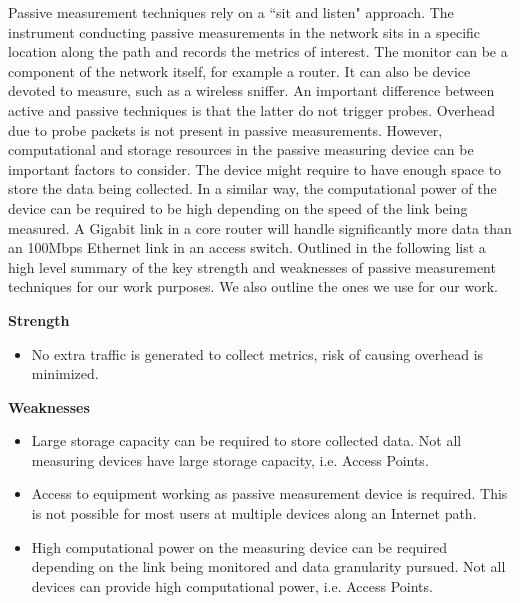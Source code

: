 Passive measurement techniques rely on a ``sit and listen" approach. The instrument conducting passive measurements in the network sits in a specific location along the path and records the metrics of interest. The monitor can be a component of the network itself, for example a router. It can also be device devoted to measure, such as a wireless sniffer. An important difference between active and passive techniques is that the latter do not trigger probes. Overhead due to probe packets is not present in passive measurements. However, computational and storage resources in the passive measuring device can be important factors to consider. The device might require to have enough space to store the data being collected. In a similar way, the computational power of the device can be required to be high depending on the speed of the link being measured. A Gigabit link in a core router will handle significantly more data than an 100Mbps Ethernet link in an access switch. 
Outlined in the following list a high level summary of the key strength and weaknesses of passive measurement techniques for our work purposes. We also outline the ones we use for our work.

\textbf{Strength}
\begin{itemize}
	\item No extra traffic is generated to collect metrics, risk of causing overhead is minimized.
\end{itemize}


\textbf{Weaknesses}
\begin{itemize}
	\item Large storage capacity can be required to store collected data. Not all measuring devices have large storage capacity, i.e. Access Points.
	\item Access to equipment working as passive measurement device is required. This is not possible for most users at multiple devices along an Internet path.
	\item High computational power on the measuring device can be required depending on the link being monitored and data granularity pursued. Not all devices can provide high computational power, i.e. Access Points.
\end{itemize}

